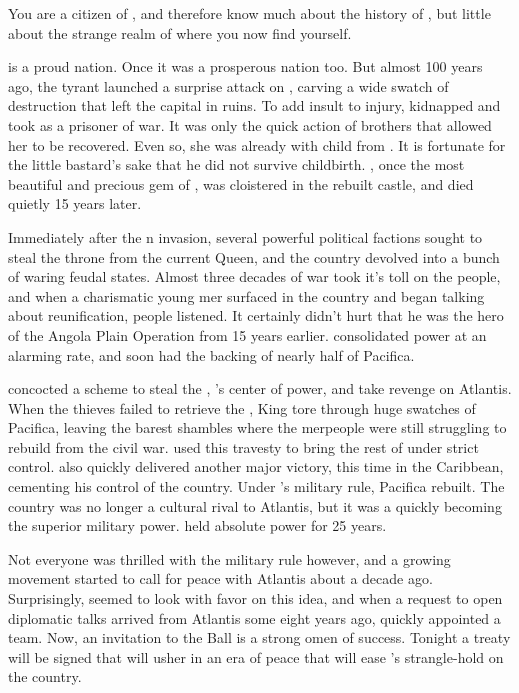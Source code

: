\documentclass[blue]{NeptuneBall}
\begin{document}
\name{\bPacifican{}}

You are a citizen of \pPacifica{}, and therefore know much about the history of \pPacifica{}, but little about the strange realm of \pAtlantis{} where you now find yourself.

\pPacifica{} is a proud nation. Once it was a prosperous nation too. But almost 100 years ago, the tyrant \cExExKing{\MYname{}} launched a surprise attack on \pPacifica{}, carving a wide swatch of destruction that left the capital in ruins. To add insult to injury, \cExExKing{} kidnapped \cMother{\Prince} \cMother{\MYname{}} and took \cMother{\them} as a prisoner of war. It was only the quick action of \cMother{\them} brothers that allowed her to be recovered. Even so, she was already with child from \cExExKing{}. It is fortunate for the little bastard's sake that he did not survive childbirth. \cMother{}, once the most beautiful and precious gem of \pPacifica{}, was cloistered in the rebuilt castle, and died quietly 15 years later.

Immediately after the \pAtlantis{}n invasion, several powerful political factions sought to steal the throne from the current Queen, and the country devolved into a bunch of waring feudal states. Almost three decades of war took it's toll on the people, and when a charismatic young mer\cPacificanRuler{\human{}} surfaced in the country and began talking about reunification, people listened. It certainly didn't hurt that he was the hero of the Angola Plain Operation from 15 years earlier. \cPacificanRuler{\MYname{}} consolidated power at an alarming rate, and soon had the backing of nearly half of Pacifica.

\cPacificanRuler{\They{}} concocted a scheme to steal the \iTriton{\MYname{}}, \cKing{}'s center of power, and take revenge on Atlantis. When the thieves failed to retrieve the \iTriton{\MYname{}}, King \cKing{\MYname{}} tore through huge swatches of Pacifica, leaving the barest shambles where the merpeople were still struggling to rebuild from the civil war. \cPacificanRuler{\MYname{}} used this travesty to bring the rest of \pPacifica{} under \cPacificanRuler{\their{}} strict control. \cPacificanRuler{} also quickly delivered another major victory, this time in the Caribbean, cementing his control of the country. Under \cPacificanRuler{\MYname{}}'s military rule, Pacifica rebuilt. The country was no longer a cultural rival to Atlantis, but it was a quickly becoming the superior military power. \cPacificanRuler{}  held absolute power for 25 years.

Not everyone was thrilled with the military rule however, and a growing movement started to call for peace with Atlantis about a decade ago. Surprisingly, \cPacificanRuler{\MYname{}} seemed to look with favor on this idea, and when a request to open diplomatic talks arrived from Atlantis some eight years ago, \cPacificanRuler{\they{}} quickly appointed a team. Now, an invitation to the \cKing{\MYname{}} Ball is a strong omen of success. Tonight a treaty will be signed that will usher in an era of peace that will ease \cPacificanRuler{\MYname{}}'s strangle-hold on the country.
\end{document}

